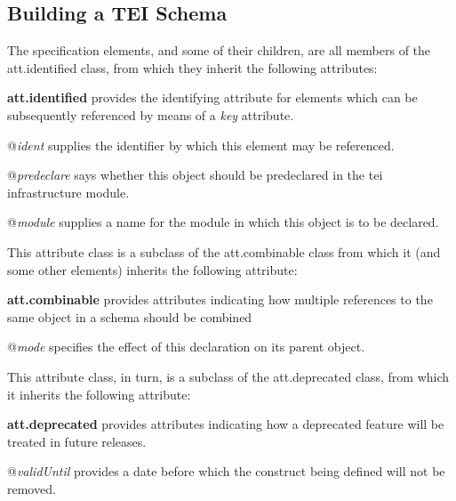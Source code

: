 \subsection[{Building a TEI Schema}]{Building a TEI Schema}\label{TDB1}\par
The specification elements, and some of their children, are all members of the \textsf{att.identified} class, from which they inherit the following attributes: 
\begin{sansreflist}
  
\item [\textbf{att.identified}] provides the identifying attribute for elements which can be subsequently referenced by means of a {\itshape key} attribute.\hfil\\[-10pt]\begin{sansreflist}
    \item[@{\itshape ident}]
  supplies the identifier by which this element may be referenced.
    \item[@{\itshape predeclare}]
  says whether this object should be predeclared in the \textsf{tei} infrastructure module.
    \item[@{\itshape module}]
  supplies a name for the module in which this object is to be declared.
\end{sansreflist}  
\end{sansreflist}
 This attribute class is a subclass of the \textsf{att.combinable} class from which it (and some other elements) inherits the following attribute: 
\begin{sansreflist}
  
\item [\textbf{att.combinable}] provides attributes indicating how multiple references to the same object in a schema should be combined\hfil\\[-10pt]\begin{sansreflist}
    \item[@{\itshape mode}]
  specifies the effect of this declaration on its parent object.
\end{sansreflist}  
\end{sansreflist}
 This attribute class, in turn, is a subclass of the \textsf{att.deprecated} class, from which it inherits the following attribute: 
\begin{sansreflist}
  
\item [\textbf{att.deprecated}] provides attributes indicating how a deprecated feature will be treated in future releases.\hfil\\[-10pt]\begin{sansreflist}
    \item[@{\itshape validUntil}]
  provides a date before which the construct being defined will not be removed.
\end{sansreflist}  
\end{sansreflist}
